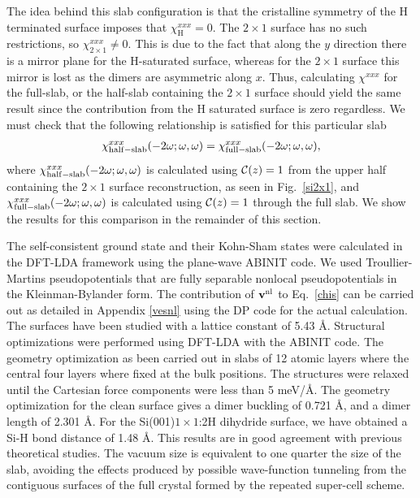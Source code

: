 \documentclass[floatfix,prb,aps,superscriptaddress,11pt,preprint,letterpaper]{revtex4}
\begin{document}
The idea behind this slab configuration is that the 
cristalline symmetry of the H terminated surface imposes that 
$\chi_{\mathrm{H}}^{xxx}=0$.
 The $2\times 1$ surface has no 
such restrictions, so $\chi_{2\times 1}^{xxx}\ne 0$.
This is due to the fact that along the $y$ direction there is a mirror plane for the
H-saturated surface, whereas 
for the $2\times 1$ surface this mirror is lost as the dimers are
asymmetric along $x$. 
Thus, calculating $\chi^{xxx}$ for the full-slab, or the 
half-slab containing the $2\times 1$ surface\cite{note1}
should yield the same result since the contribution from the H
saturated surface is zero regardless. 
We must check that the following 
relationship is satisfied for this particular slab
\begin{align}\label{hs}
\chi_{\mathrm{half-slab}}^{xxx}(-2\omega;\omega,\omega) 
=
\chi_{\mathrm{full-slab}}^{xxx}(-2\omega;\omega,\omega) 
,
\end{align}
where
$\chi_{\mathrm{half-slab}}^{xxx}(-2\omega;\omega,\omega)$ is calculated using
${\mathbf{\cal C}}(z)=1$ from the upper half containing the $2\times 1$ 
surface reconstruction, as seen in Fig.~\ref{si2x1},
and $\chi_{\mathrm{full-slab}}^{xxx}(-2\omega;\omega,\omega)$ is calculated using
${\mathbf{\cal C}}(z)=1$ through the full slab.
We show the results for this comparison in the remainder 
of this section.


The self-consistent ground state and their Kohn-Sham states were
calculated in the DFT-LDA framework using the plane-wave 
ABINIT code.\cite{abinit}
We used Troullier-Martins pseudopotentials\cite{troullierPRB91} that are 
fully separable nonlocal pseudopotentials in the Kleinman-Bylander 
form.\cite{kleinmanPRL82}
The contribution of $\mathbf{v}^{\mathrm{nl}}$ to Eq.~\eqref{chis} can be carried out 
as detailed in Appendix \ref{vesnl} using the DP code for 
the actual calculation.\cite{francesco}
%
The surfaces have been studied with a lattice constant of 5.43 \AA. 
Structural optimizations were performed using DFT-LDA
with the ABINIT code.\cite{abinit}  
The geometry optimization as been carried out in slabs of 12
atomic layers where the central four layers where fixed at the bulk
positions.  
The structures were relaxed until the Cartesian force components were less than 5 meV/\AA. 
The geometry optimization for the clean surface gives
a dimer buckling of 0.721 \AA, and a dimer length of 2.301 \AA.  
For the  Si(001)$1\times 1$:2H dihydride surface, we have obtained a Si-H bond distance of 1.48 \AA. 
This results are in good agreement with previous 
theoretical studies.\cite{caramellaPRB09,mendozaPRB06}
The vacuum size is equivalent to one quarter the
size of the slab, avoiding the effects produced by possible 
wave-function tunneling from the contiguous surfaces of the full
crystal formed by the repeated super-cell scheme.\cite{mendozaPRB06}    
\end{document}
